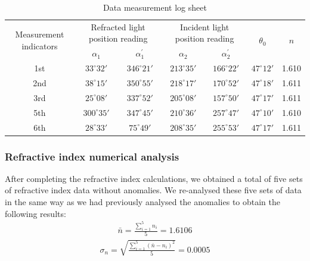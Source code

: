 \documentclass[UTF8]{article}
\begin{document}
    \begin{table}[htbp]
      \centering
      \caption{Data measurement log sheet}
        \begin{tabular}{ccccccc}
        \toprule[2pt]
        \multicolumn{1}{c}{\multirow{2}[0]{*}{Measurement indicators}} & \multicolumn{2}{c}{Refracted light position reading} & \multicolumn{2}{c}{Incident light position reading} &
         \multicolumn{1}{c}{\multirow{2}[0]{*}{$\theta _{0} $}} & \multicolumn{1}{c}{\multirow{2}[0]{*}{$n$}} \\
         \cmidrule{2-3} 
         \cmidrule{4-5}
              & $\alpha_1 $ & $\alpha^{'}_1 $ & $\alpha_2 $ & $\alpha^{'}_2 $ &  \\
        \midrule
        1st   & $33^{\circ}32'$ & $346^{\circ}21'$ & $213^{\circ}35'$ & $166^{\circ}22'$ & $47^{\circ}12'$ & 1.610\\
        2nd   & $38^{\circ}15'$ & $350^{\circ}55'$ & $218^{\circ}17'$ & $170^{\circ}52'$ & $47^{\circ}18'$ & 1.611\\
        3rd   & $25^{\circ}08'$ & $337^{\circ}52'$ & $205^{\circ}08'$ & $157^{\circ}50'$ & $47^{\circ}17'$ & 1.611\\
        5th   & $300^{\circ}35'$ & $347^{\circ}45'$ & $210^{\circ}36'$ & $257^{\circ}47'$ & $47^{\circ}10'$ & 1.610\\
        6th   & $28^{\circ}33'$ & $75^{\circ}49'$ & $208^{\circ}35'$ & $255^{\circ}53'$ & $47^{\circ}17'$ & 1.611\\
        \bottomrule[2pt]
        \end{tabular}%
      \label{tab:addlabel}%
    \end{table}%
    

    \subsubsection{Refractive index numerical analysis}
   After completing the refractive index calculations, we obtained a total of five sets of refractive index data without anomalies. We re-analysed these five sets of data in the same way as we had previously analysed the anomalies to obtain the following results:
   \begin{eqnarray}
   \bar{n}  = \frac{\sum_{i=1}^{5}n_i  }{5} =1.6106
   \end{eqnarray}
   \begin{eqnarray}
    \sigma _{n } =\sqrt{\frac{ {\textstyle \sum_{i=1}^{5}}\left ( \bar{n} - n_i\right )^2  }{5}   } = 0.0005 
   \end{eqnarray}
   
\end{document}
